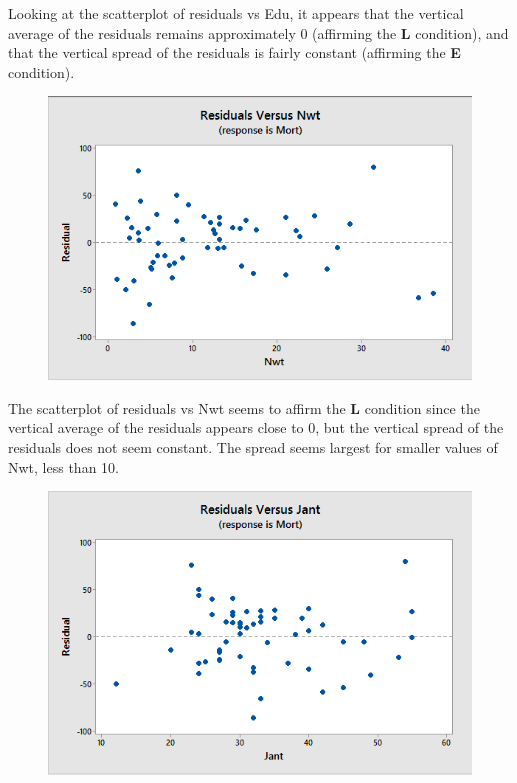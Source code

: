 \documentclass{article}
\begin{document}
Looking at the scatterplot of residuals vs Edu, it appears that the vertical average of
the residuals remains approximately 0 (affirming the \textbf{L}
condition), and that the vertical spread of the residuals is fairly
constant (affirming the \textbf{E} condition).

\begin{figure}[h!]
 \centering
 \includegraphics[scale=.5]{./images/scatterplot_residuals-vs-Nwt.png}
\end{figure}

The scatterplot of residuals vs Nwt seems to affirm the \textbf{L}
condition since the vertical average of the residuals appears close to
0, but the vertical spread of the residuals does not seem constant. The
spread seems largest for smaller values of Nwt, less than 10.

\begin{figure}[h!]
 \centering
 \includegraphics[scale=.5]{./images/scatterplot_residuals-vs-Jant.png}
\end{figure}
\end{document}
